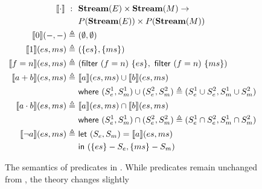 \documentclass[sigconf,usenames,dvipsnames,svgnames,table]{acmart}
\begin{document}
        \begin{figure}
          \centering
          \begin{align*}
            \interp{ \cdot }\ 
              :\ \ &
              \mathbf{Stream}(E)\times \mathbf{Stream}(M) \rightarrow \\
              & P(\mathbf{Stream}(E))\times P(\mathbf{Stream}(M)) 
              \\
            \interp{ 0 }(-, -)
              \triangleq\ &
              (\emptyset , \emptyset)
              \\ %
            \interp{ 1 }(es, ms)
              \triangleq\ &
              (\{es\},\{ms\})
              \\
            \interp{ f=n }(es, ms)
              \triangleq\ &
              (\mathsf{filter}\ (f=n)\ \{es\},\
               \mathsf{filter}\ (f=n)\ \{ms\}) 
              \\
            \interp{ a + b }(es, ms)
              \triangleq\ &
              \interp { a }(es, ms)\cup
              \interp { b }(es, ms) \\
              &\mathsf{where}\ (S_e^1, S_m^1)\cup (S_e^2, S_m^2)\triangleq
                (S_e^1\cup S_e^2, S_m^1\cup S_m^2)\\
            \interp { a \cdot b }(es, ms)
              \triangleq\ &
              \interp { a }(es, ms)\cap
              \interp { b }(es, ms) \\
              &\mathsf{where}\ (S_e^1, S_m^1)\cap (S_e^2, S_m^2)\triangleq
                (S_e^1\cap S_e^2, S_m^1\cap S_m^2)\\
            \interp { \neg a }(es, ms)
              \triangleq\ &
              \mathsf{let}\ (S_e, S_m) = \interp {a}(es, ms) \\
              &\mathsf{in}\ (\{es\} - S_e, \{ms\} - S_m)
              \\
          \end{align*}
          \caption{The semantics of predicates in \sysname.  While predicates remain unchanged from \oldname, the theory changes slightly}
          \label{fig:garuda:sem:pol}
        \end{figure}

\end{document}
